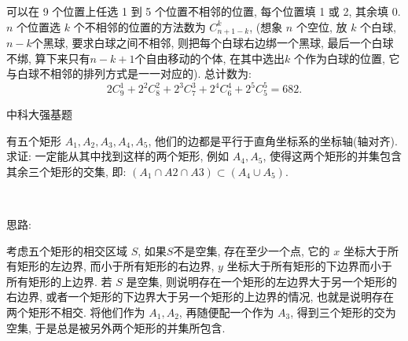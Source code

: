 可以在 9 个位置上任选 1 到 5 个位置不相邻的位置, 每个位置填 1 或 2, 其余填 0. $n$ 个位置选 $k$ 个不相邻的位置的方法数为 $C_{n+1-k}^{k}$, (想象 $n$ 个空位, 放 $k$ 个白球, $n-k$个黑球, 要求白球之间不相邻, 则把每个白球右边绑一个黑球, 最后一个白球不绑, 算下来只有$n-k+1$个自由移动的个体, 在其中选出$k$ 个作为白球的位置, 它与白球不相邻的排列方式是一一对应的). 总计数为:
\[ 2C_9^1 + 2^2 C_8^2 + 2^3 C_7^3 + 2^4 C_6^4 + 2^5 C_5^5 = 682 .\]

\newpage

\noindent 中科大强基题

有五个矩形 $A_1, A_2, A_3, A_4, A_5$, 他们的边都是平行于直角坐标系的坐标轴(轴对齐). 求证: 一定能从其中找到这样的两个矩形, 例如 $A_4, A_5$, 使得这两个矩形的并集包含其余三个矩形的交集, 即: $(A_1\cap A2\cap A3) \subset (A_4\cup A_5)$. 

~

\noindent 思路:

考虑五个矩形的相交区域 $S$, 如果$S$不是空集, 存在至少一个点, 它的 $x$ 坐标大于所有矩形的左边界, 而小于所有矩形的右边界, $y$ 坐标大于所有矩形的下边界而小于所有矩形的上边界. 若 $S$ 是空集, 则说明存在一个矩形的左边界大于另一个矩形的右边界, 或者一个矩形的下边界大于另一个矩形的上边界的情况, 也就是说明存在两个矩形不相交. 将他们作为 $A_1, A_2$, 再随便配一个作为 $A_3$, 得到三个矩形的交为空集, 于是总是被另外两个矩形的并集所包含. 

